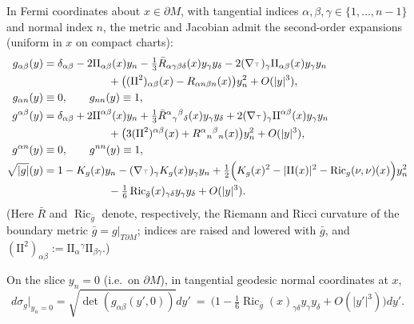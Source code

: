 \documentclass[11pt,reqno,a4paper]{amsart}
\numberwithin{equation}{section}
\theoremstyle{plain}
\theoremstyle{remark}
\theoremstyle{plain}
\begin{document}
In Fermi coordinates about $x\in\partial M$, with tangential indices
$\alpha,\beta,\gamma\in\{1,\dots,n-1\}$ and normal index $n$, the metric and Jacobian admit the
second-order expansions (uniform in $x$ on compact charts):
\begin{align}
g_{\alpha\beta}(y)
&=\delta_{\alpha\beta}
-2\mathrm{II}_{\alpha\beta}(x)y_n
-\tfrac13\bar R_{\alpha\gamma\beta\delta}(x)y_\gamma y_\delta
-2(\nabla_{{}^\top})_{\gamma}\mathrm{II}_{\alpha\beta}(x)y_\gamma y_n
\notag\\&\hspace{6em}+\big((\mathrm{II}^2)_{\alpha\beta}(x)-R_{\alpha n\beta n}(x)\big)y_n^2
+O(|y|^3),\label{eq:fermi-g}\\
g_{\alpha n}(y)&\equiv 0,\qquad g_{n n}(y)\equiv 1,\nonumber\\
g^{\alpha\beta}(y)
&=\delta_{\alpha\beta}
+2\mathrm{II}^{\alpha\beta}(x)y_n
+\tfrac13\bar R^{\alpha}{}_{\gamma}{}^{\beta}{}_{\delta}(x)y_\gamma y_\delta
+2(\nabla_{{}^\top})_{\gamma}\mathrm{II}^{\alpha\beta}(x)y_\gamma y_n
\notag\\&\hspace{6em}+\big(3(\mathrm{II}^2)^{\alpha\beta}(x)+R^{\alpha}{}_{n}{}^{\beta}{}_{n}(x)\big)y_n^2
+O(|y|^3),\label{eq:fermi-ginv}\\
g^{\alpha n}(y)&\equiv 0,\qquad g^{n n}(y)\equiv 1,\nonumber\\
\sqrt{|g|}(y)
&=1- K_g(x)y_n
-(\nabla_{{}^\top})_{\gamma}K_g(x)y_\gamma y_n
+\tfrac12\Big(K_g(x)^2-|\mathrm{II}(x)|^2-\operatorname{Ric}_g(\nu,\nu)(x)\Big)y_n^2
\notag\\&\hspace{6em}-\tfrac16\operatorname{Ric}_{\bar g}(x)_{\gamma\delta}y_\gamma y_\delta
+ O(|y|^3).
\label{eq:fermi-J}
\end{align}
(Here $\bar R$ and $\operatorname{Ric}_{\bar g}$ denote, respectively, the Riemann and Ricci curvature of the boundary metric $\bar g=g|_{T\partial M}$; indices are raised and lowered with $\bar g$, and $(\mathrm{II}^2)_{\alpha\beta}:=\mathrm{II}_{\alpha}{}^{\gamma}\mathrm{II}_{\beta\gamma}$.)

On the slice $y_n=0$ (i.e.\ on $\partial M$), in tangential geodesic normal coordinates at $x$,
\begin{equation}\label{eq:boundary-surface}
d\sigma_g\big|_{y_n=0}=\sqrt{\det(g_{\alpha\beta}(y',0))}dy'
\ =\ \big(1-\tfrac16\operatorname{Ric}_{\bar g}(x)_{\gamma\delta}y_\gamma y_\delta
+O(|y'|^3)\big)dy'.
\end{equation}
\end{document}

